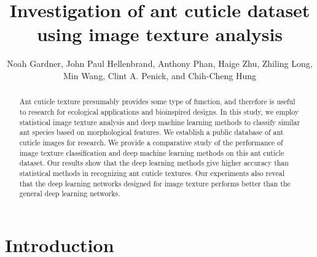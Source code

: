 \documentclass{aci}
\numberwithin{equation}{section}
\begin{document}
\title{Investigation of ant cuticle dataset using image texture
    analysis}

\author{%
    Noah Gardner,
    John Paul Hellenbrand,
    Anthony Phan,
    Haige Zhu,
    Zhiling Long, \\
    Min Wang,
    Clint A. Penick,
    and Chih-Cheng Hung\corrauth
}%


\address{%
}


\begin{abstract}
    Ant cuticle texture presumably provides some type of function, and therefore
    is useful to research for ecological applications and bioinspired designs.
    In this study, we employ statistical image texture analysis and deep machine
    learning methods to classify similar ant species based on morphological
    features. We establish a public database of ant cuticle images for research.
    We provide a comparative study of the performance of image texture
    classification and deep machine learning methods on this ant cuticle dataset.
    Our results show that the deep learning methods give higher accuracy than
    statistical methods in recognizing ant cuticle textures. Our experiments
    also reveal that the deep learning networks designed for image texture
    performs better than the general deep learning networks.
\end{abstract}
\maketitle

\section{Introduction}
\end{document}
